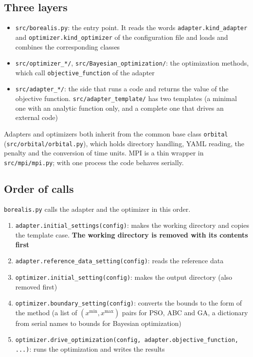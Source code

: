 \documentclass[11pt,a4paper]{article}
\begin{document}
\subsection{Three layers}

\begin{itemize}
\item \texttt{src/borealis.py}: the entry point. It reads the words \texttt{adapter.kind\_adapter} and \texttt{optimizer.kind\_optimizer} of the configuration file and loads and combines the corresponding classes
\item \texttt{src/optimizer\_*/}, \texttt{src/Bayesian\_optimization/}: the optimization methods, which call \texttt{objective\_function} of the adapter
\item \texttt{src/adapter\_*/}: the side that runs a code and returns the value of the objective function. \texttt{src/adapter\_template/} has two templates (a minimal one with an analytic function only, and a complete one that drives an external code)
\end{itemize}

Adapters and optimizers both inherit from the common base class \texttt{orbital} (\texttt{src/orbital/orbital.py}), which holds directory handling, YAML reading, the penalty and the conversion of time units. MPI is a thin wrapper in \texttt{src/mpi/mpi.py}; with one process the code behaves serially.

\subsection{Order of calls}

\texttt{borealis.py} calls the adapter and the optimizer in this order.

\begin{enumerate}
\item \texttt{adapter.initial\_settings(config)}: makes the working directory and copies the template case. \textbf{The working directory is removed with its contents first}
\item \texttt{adapter.reference\_data\_setting(config)}: reads the reference data
\item \texttt{optimizer.initial\_setting(config)}: makes the output directory (also removed first)
\item \texttt{optimizer.boundary\_setting(config)}: converts the bounds to the form of the method (a list of $(x^{\min}, x^{\max})$ pairs for PSO, ABC and GA, a dictionary from serial names to bounds for Bayesian optimization)
\item \texttt{optimizer.drive\_optimization(config, adapter.objective\_function, ...)}: runs the optimization and writes the results
\end{enumerate}
\end{document}
